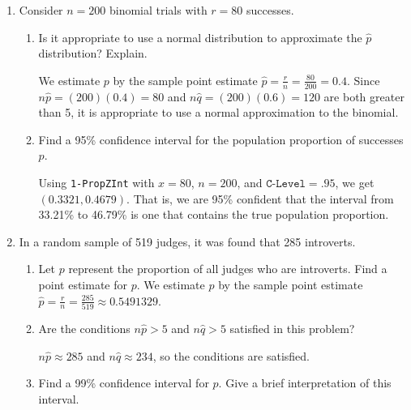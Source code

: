 \documentclass{article}
\newcommand{\answer}[1]{\color{white}#1}
\begin{document}
\pagestyle{myheadings}

\begin{center}
\textbf{}
\end{center}


\begin{enumerate}

\item Consider $n=200$ binomial trials with $r=80$ successes.
	\begin{enumerate}
	\item Is it appropriate to use a normal distribution to approximate the $\hat{p}$ distribution? Explain. 
	
	{\answer We estimate $p$ by the sample point estimate $\hat{p} = \frac{r}{n} = \frac{80}{200} = 0.4$. 
	Since $n\hat{p} = (200)(0.4) = 80$ and $n\hat{q} = (200)(0.6) = 120$ are both greater than 5, it is appropriate to use a normal approximation to the binomial.
	} 
	
	\item Find a 95\% confidence interval for the population proportion of successes $p$. 
	
	{\answer Using \texttt{1-PropZInt} with $x=80$, $n=200$, and $\texttt{C-Level} = .95$, we get $(0.3321, 0.4679)$. That is, we are 95\% confident that the interval from 33.21\% to 46.79\% is one that contains the true population proportion.
	} 
	\end{enumerate}
	
\item In a random sample of 519 judges, it was found that 285 introverts.
	\begin{enumerate}
	\item Let $p$ represent the proportion of all judges who are introverts. Find a point estimate for $p$. 
	{\answer We estimate $p$ by the sample point estimate $\hat{p} = \frac{r}{n} = \frac{285}{519} \approx 0.5491329$.
	} 
	
	\item Are the conditions $n\hat{p} >5$ and $n\hat{q}>5$ satisfied in this problem? 
	
	{\answer $n\hat{p} \approx 285$ and $n\hat{q} \approx 234$, so the conditions are satisfied.
	} 
	
	\item Find a 99\% confidence interval for $p$. Give a brief interpretation of this interval. 
	

\end{enumerate}
\end{enumerate}
\end{document}
